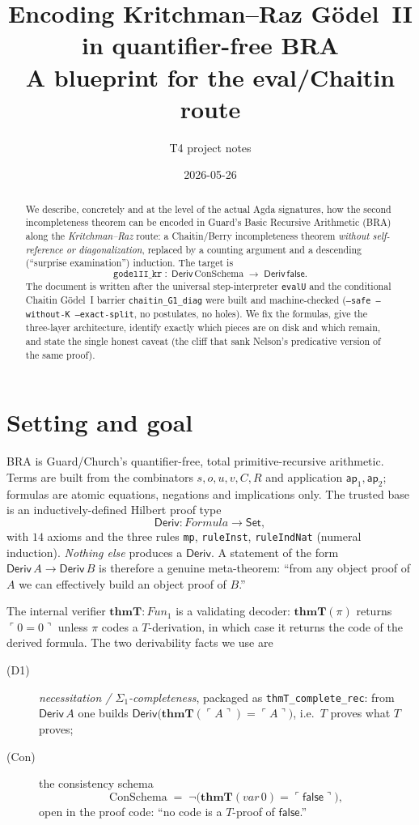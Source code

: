 \documentclass[11pt]{article}
\title{Encoding Kritchman--Raz G\"odel~II in quantifier-free BRA\\
       \large A blueprint for the eval/Chaitin route}
\author{T4 project notes}
\date{2026-05-26}
\theoremstyle{plain}
\theoremstyle{definition}
\theoremstyle{remark}
\newcommand{\code}[1]{\ulcorner #1 \urcorner}
\newcommand{\thmT}{\mathbf{thmT}}
\newcommand{\Deriv}{\mathsf{Deriv}}
\newcommand{\false}{\mathsf{false}}
\begin{document}
\maketitle

\begin{abstract}
We describe, concretely and at the level of the actual Agda signatures, how the
second incompleteness theorem can be encoded in Guard's Basic Recursive
Arithmetic (BRA) along the \emph{Kritchman--Raz} route: a Chaitin/Berry
incompleteness theorem \emph{without self-reference or diagonalization}, replaced
by a counting argument and a descending (``surprise examination'') induction.
The target is
\[
  \texttt{godelII\_kr} \;:\; \Deriv\,\mathrm{ConSchema} \;\longrightarrow\; \Deriv\,\false .
\]
The document is written after the universal step-interpreter
\texttt{evalU} and the conditional Chaitin G\"odel~I barrier
\texttt{chaitin\_G1\_diag} were built and machine-checked
(\texttt{--safe --without-K --exact-split}, no postulates, no holes). We fix the
formulas, give the three-layer architecture, identify exactly which pieces are on
disk and which remain, and state the single honest caveat (the cliff that sank
Nelson's predicative version of the same proof).
\end{abstract}

\tableofcontents

\section{Setting and goal}

BRA is Guard/Church's quantifier-free, total primitive-recursive arithmetic. Terms
are built from the combinators $s,o,u,v,C,R$ and application $\mathsf{ap}_1,
\mathsf{ap}_2$; formulas are atomic equations, negations and implications only.
The trusted base is an inductively-defined Hilbert proof type
\[
  \Deriv : \mathit{Formula} \to \mathsf{Set},
\]
with $14$ axioms and the three rules \texttt{mp}, \texttt{ruleInst},
\texttt{ruleIndNat} (numeral induction). \emph{Nothing else} produces a
$\Deriv$. A statement of the form $\Deriv\,A \to \Deriv\,B$ is therefore a
genuine meta-theorem: ``from any object proof of $A$ we can effectively build an
object proof of $B$.''

The internal verifier $\thmT : \mathit{Fun}_1$ is a validating decoder:
$\thmT(\pi)$ returns $\code{0=0}$ unless $\pi$ codes a $T$-derivation, in which
case it returns the code of the derived formula. The two derivability facts we
use are
\begin{description}
\item[(D1)] \emph{necessitation / $\Sigma_1$-completeness}, packaged as
  \texttt{thmT\_complete\_rec}: from $\Deriv\,A$ one builds
  $\Deriv\big(\thmT(\code{A}) = \code{A}\big)$, i.e.\ $T$ proves what $T$ proves;
\item[(Con)] the consistency schema
  \[
    \mathrm{ConSchema} \;=\; \neg\big(\thmT(\mathit{var}\,0) = \code{\false}\big),
  \]
  open in the proof code: ``no code is a $T$-proof of $\false$.''
\end{description}
\end{document}
